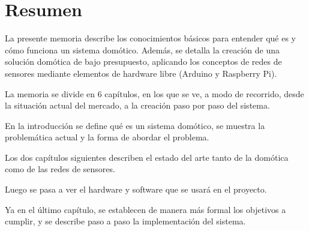  
 \chapter*{Resumen}
 

 
 La presente memoria describe los conocimientos básicos para entender qué es y cómo funciona un sistema domótico. Además, se detalla la creación de una solución domótica de bajo presupuesto, aplicando los conceptos de redes de sensores mediante elementos de hardware libre (Arduino y Raspberry Pi).
 
 
 La memoria se divide en 6 capítulos, en los que se ve, a modo de recorrido, desde la situación actual del mercado, a la creación paso por paso del sistema.
 
 En la introducción se define qué es un sistema domótico,  se muestra la problemática actual y la forma de abordar el problema.
 
 Los dos capítulos siguientes describen el estado del arte tanto de la domótica como de las redes de sensores. 
 
 Luego se pasa a ver el hardware y software que se usará en el proyecto.
 
 Ya en el último capítulo, se establecen de manera más formal los objetivos a cumplir, y se describe paso a paso la implementación del sistema.
\cleardoublepage